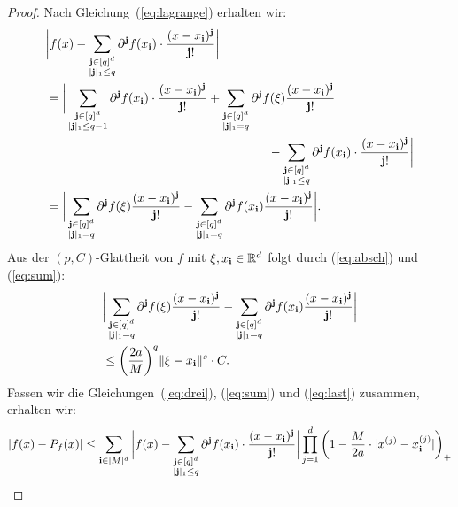 \begin{proof}
Nach Gleichung~(\ref{eq:lagrange}) erhalten wir:
\begin{equation}
\label{eq:sum}
\begin{split}
& \bigg|f(x) - \sum_{\substack{\mathbf{j} \in [q]^d \\|\mathbf{j}|_1 \leq q}} \partial^{\mathbf{j}}f(x_{\mathbf{i}}) \cdot \frac{(x - x_{\mathbf{i}})^{\mathbf{j}}}{\mathbf{j}!}\bigg| \\ 
& = \bigg| \sum_{\substack{\mathbf{j} \in [q]^d \\ |\mathbf{j}|_1 \leq q - 1}}  \partial^{\mathbf{j}}f(x_{\mathbf{i}}) \cdot \frac{ (x - x_{\mathbf{i}})^{\mathbf{j}} }{\mathbf{j}!} + \sum_{\substack{ \mathbf{j} \in [q]^d \\|\mathbf{j}|_1 = q}} \partial^{\mathbf{j}}f(\xi) \frac{ (x - x_{\mathbf{i}})^{\mathbf{j}} }{\mathbf{j}!} \\
& \qquad \qquad \qquad \qquad \qquad \qquad \qquad \qquad \qquad - \sum_{\substack{\mathbf{j} \in [q]^d \\|\mathbf{j}|_1 \leq q}} \partial^{\mathbf{j}}f(x_{\mathbf{i}}) \cdot \frac{(x - x_{\mathbf{i}})^{\mathbf{j}}}{\mathbf{j}!}\bigg| \\
& = \bigg| \sum_{\substack{ \mathbf{j} \in [q]^d \\|\mathbf{j}|_1 = q}} \partial^{\mathbf{j}}f(\xi) \frac{ (x - x_{\mathbf{i}})^{\mathbf{j}} }{\mathbf{j}!} - \sum_{\substack{ \mathbf{j} \in [q]^d \\|\mathbf{j}|_1 = q}} \partial^{\mathbf{j}}f(x_{\mathbf{i}}) \frac{ (x - x_{\mathbf{i}})^{\mathbf{j}} }{\mathbf{j}!}\bigg|.
\end{split}
\end{equation}
Aus der $(p,C)$-Glattheit von $f$ mit $\xi, x_{\mathbf{i}} \in \mathbb{R}^d$ folgt durch (\ref{eq:absch}) und (\ref{eq:sum}):
\begin{equation}
\label{eq:last}
\begin{split}
& \bigg| \sum_{\substack{ \mathbf{j} \in [q]^d \\|\mathbf{j}|_1 = q}} \partial^{\mathbf{j}}f(\xi) \frac{ (x - x_{\mathbf{i}})^{\mathbf{j}} }{\mathbf{j}!} - \sum_{\substack{ \mathbf{j} \in [q]^d \\|\mathbf{j}|_1 = q}} \partial^{\mathbf{j}}f(x_{\mathbf{i}}) \frac{ (x - x_{\mathbf{i}})^{\mathbf{j}} }{\mathbf{j}!}\bigg| \\
& \leq \bigg(\frac{2a}{M}\bigg)^q \|\xi - x_{\mathbf{i}} \|^s \cdot C.
\end{split}
\end{equation}
Fassen wir die Gleichungen~(\ref{eq:drei}), (\ref{eq:sum}) und (\ref{eq:last}) zusammen, erhalten wir:
\begin{equation*}
\begin{split}
|f(x) - P_f(x)| & \leq \sum_{\bi \in [M]^d} \bigg|f(x) - \sum_{\substack{\mathbf{j} \in [q]^d \\|\mathbf{j}|_1 \leq q}} \partial^{\mathbf{j}}f(x_{\mathbf{i}}) \cdot \frac{(x - x_{\mathbf{i}})^{\mathbf{j}}}{\mathbf{j}!}\bigg| \prod_{j = 1}^d \bigg(1 - \frac{M}{2a} \cdot |x^{(j)} - x_{\mathbf{i}}^{(j)}|\bigg)_+ \\

\end{split}
\end{equation*}
\end{proof}
